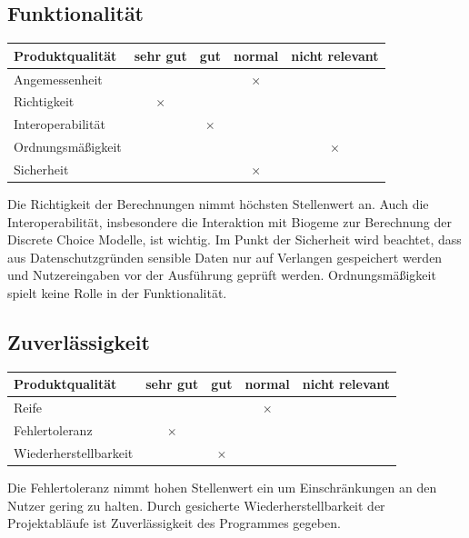 \documentclass{article}
\begin{document}
\subsection{Funktionalität}
\begin{table}[H]
\centering
\begin{tabular}{lcccc}
\hline
\textbf{Produktqualität} & sehr gut & gut      & normal   & nicht relevant \\ \hline
Angemessenheit           &          &          & $\times$ &                \\
Richtigkeit              & $\times$ &          &          &                \\
Interoperabilität        &          & $\times$ &          &                \\
Ordnungsmäßigkeit        &          &          &          & $\times$       \\
Sicherheit               &          &          & $\times$ &                \\  
\end{tabular}
\end{table}
Die Richtigkeit der Berechnungen nimmt höchsten Stellenwert an. Auch die Interoperabilität, insbesondere die Interaktion mit Biogeme zur Berechnung der Discrete Choice Modelle, ist wichtig. Im Punkt der Sicherheit wird beachtet, dass aus Datenschutzgründen sensible Daten nur auf Verlangen gespeichert werden und Nutzereingaben vor der Ausführung geprüft werden. Ordnungsmäßigkeit spielt keine Rolle in der Funktionalität.

\subsection{Zuverlässigkeit}
\begin{table}[H]
\centering
\begin{tabular}{lcccc}
\hline
\textbf{Produktqualität} & sehr gut & gut      & normal   & nicht relevant \\ \hline
Reife                    &          &          & $\times$ &                \\
Fehlertoleranz           & $\times$ &          &          &                \\
Wiederherstellbarkeit    &          & $\times$ &          &                \\
\end{tabular}
\end{table}
Die Fehlertoleranz nimmt hohen Stellenwert ein um Einschränkungen an den Nutzer gering zu halten. Durch gesicherte Wiederherstellbarkeit der Projektabläufe ist Zuverlässigkeit des Programmes gegeben. 
\end{document}

